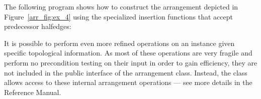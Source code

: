 \begin{ccAdvanced}
The following program shows how to construct the arrangement
depicted in Figure~\ref{arr_fig:ex_4} using the specialized
insertion functions that accept predecessor halfedges:


It is possible to perform even more refined operations on an
 instance given specific topological information.
As most of these operations are very fragile and perform no precondition
testing on their input in order to gain efficiency, they are not included
in the public interface of the arrangement class. Instead, the
 class allows access to these internal
arrangement operations --- see more details in the Reference Manual.
\end{ccAdvanced}
